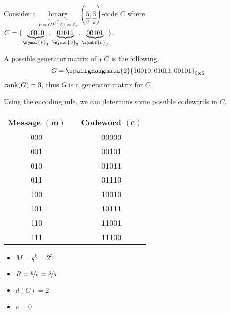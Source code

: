 
\begin{Example}{}{}
    Consider a $ \underbrace{\text{binary}}_{F=GF(2)=\mathbb{Z}_2} $
    $ (\underbrace{5}_{n},\underbrace{3}_{k}) $-code $ C $
    where
    $ C=\set{\underbrace{10010}_{\symbf{v}_1},\underbrace{01011}_{\symbf{v}_2},\underbrace{00101}_{\symbf{v}_3}} $.

    A possible generator matrix of a $ C $ is the following.
    \[ G=
        \spalignaugmatn{2}{
            1 0 0 1 0; 0 1 0 1 1; 0 0 1 0 1}_{3\times{}5}
    \]
    $ \operatorname{rank}(G)=3 $, thus $ G $ is a generator matrix for $ C $.

    Using the encoding rule, we can determine some possible codewords in $ C $.
    \begin{table}[H]
        \centering
        \begin{tabular}{@{}ccc@{}}
            Message $ (\symbf{m}) $ & \textrightarrow{} & Codeword $ (\symbf{c}) $ \\
            \midrule
            000                     & \textrightarrow{} & 00000                    \\
            001                     & \textrightarrow{} & 00101                    \\
            010                     & \textrightarrow{} & 01011                    \\
            011                     & \textrightarrow{} & 01110                    \\
            100                     & \textrightarrow{} & 10010                    \\
            101                     & \textrightarrow{} & 10111                    \\
            110                     & \textrightarrow{} & 11001                    \\
            111                     & \textrightarrow{} & 11100
        \end{tabular}
    \end{table}
    \begin{itemize}
        \item $ M=q^k=2^3 $
        \item $ R=\sfrac{k}{n}=\sfrac{3}{5} $
        \item $ d(C)=2 $
        \item $ e=0 $
    \end{itemize}
\end{Example}

